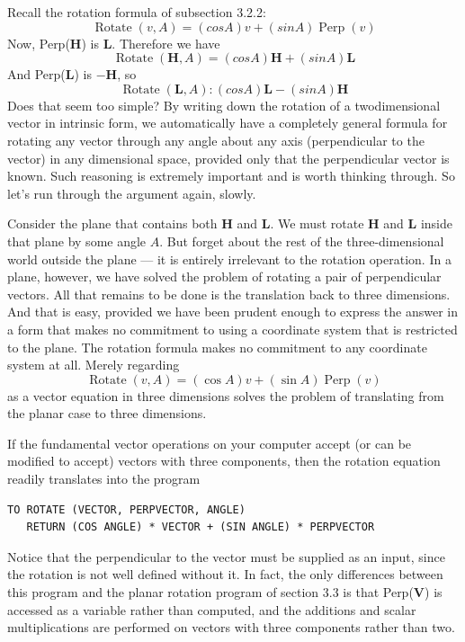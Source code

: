 \documentclass{book}
\begin{document}
Recall the rotation formula of subsection 3.2.2:
$$\operatorname{Rotate}(v,A) = (cos A)v + (sin A)\operatorname{Perp}(v)$$
 Now, Perp(\textbf{H}) is \textbf{L}. Therefore we have
$$\operatorname{Rotate}(\mathbf{H}, A) = (cos A)\mathbf{H} + (sin A)\mathbf{L}$$
 And Perp(\textbf{L}) is $-\mathbf{H}$, so
$$\operatorname{Rotate}(\mathbf{L},A) : (cos A)\mathbf{L} - (sin A)\mathbf{H}$$
 Does that seem too simple? By writing down the rotation of a twodimensional vector in intrinsic form, we automatically have a completely
general formula for rotating any vector through any angle about any axis
(perpendicular to the vector) in any dimensional space, provided only
that the perpendicular vector is known. Such reasoning is extremely
important and is worth thinking through. So let's run through the
argument again, slowly.

Consider the plane that contains both \textbf{H} and \textbf{L}. We must rotate \textbf{H} and
\textbf{L} inside that plane by some angle $A$. But forget about the rest of the
three-dimensional world outside the plane --- it is entirely irrelevant to the
rotation operation. In a plane, however, we have solved the problem of
rotating a pair of perpendicular vectors. All that remains to be done is
the translation back to three dimensions. And that is easy, provided we
have been prudent enough to express the answer in a form that makes
no commitment to using a coordinate system that is restricted to the
plane. The rotation formula makes no commitment to any coordinate
system at all. Merely regarding
$$\operatorname{Rotate}(v, A) = (\cos A)v + (\sin A)\operatorname{Perp}(v)$$
 as a vector equation in three dimensions solves the problem of translating from the planar case to three dimensions.

If the fundamental vector operations on your computer accept (or can
be modified to accept) vectors with three components, then the rotation
equation readily translates into the program

\begin{verbatim}
TO ROTATE (VECTOR, PERPVECTOR, ANGLE)
   RETURN (COS ANGLE) * VECTOR + (SIN ANGLE) * PERPVECTOR
\end{verbatim}
Notice that the perpendicular to the vector must be supplied as an
input, since the rotation is not well defined without it. In fact, the only
differences between this program and the planar rotation program of
section 3.3 is that Perp(\textbf{V}) is accessed as a variable rather than computed,
and the additions and scalar multiplications are performed on vectors
with three components rather than two.
\end{document}
